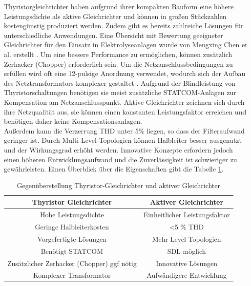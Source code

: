 Thyristorgleichrichter haben aufgrund ihrer kompakten Bauform eine höhere Leistungsdichte als aktive Gleichrichter und können in großen Stückzahlen kostengünstig produziert werden. Zudem gibt es bereits zahlreiche Lösungen für unterschiedliche Anwendungen. Eine Übersicht mit Bewertung geeigneter Gleichrichter für den Einsatz in Elektrolyseanlagen wurde von Mengxing Chen et al. erstellt \cite{HydrogenElectronicTopologies}. Um eine bessere Performance zu ermöglichen, können zusätzlich Zerhacker (Chopper) erforderlich sein. Um die Netzanschlussbedingungen zu erfüllen wird oft eine 12-pulsige Anordnung verwendet, wodurch sich der Aufbau des Netztransformators komplexer gestaltet \cite{HydrogenRectInf}. Aufgrund der Blindleistung von Thyristorschaltungen benötigen sie meist zusätzliche STATCOM-Anlagen zur Kompensation am Netzanschlusspunkt. Aktive Gleichrichter zeichnen sich durch ihre Netzqualität aus, sie können einen konstanten Leistungsfaktor erreichen und benötigen daher keine Kompensationsanlagen.\\ Außerdem kann die Verzerrung \gls{THD} unter 5\% liegen, so dass der Filteraufwand geringer ist. Durch Multi-Level-Topologien können Halbleiter besser ausgenutzt und der Wirkungsgrad erhöht werden. Innovative Konzepte erfordern jedoch einen höheren Entwicklungsaufwand und die Zuverlässigkeit ist schwieriger zu gewährleisten. Einen Überblick über die Eigenschaften gibt die Tabelle \ref{tab:thyVSafe}. 
\begin{table}[t]
	\centering
	\caption{Gegenüberstellung Thyristor-Gleichrichter und aktiver Gleichrichter}
	\label{tab:thyVSafe}
	\begin{tabular}{c|c} 
		\textbf{Thyristor Gleichrichter} & \textbf{Aktiver Gleichrichter} \\
		\hline
		Hohe Leistungsdichte & Einheitlicher Leistungsfaktor \\
		\hline
		Geringe Halbleiterkosten & <5 \% \gls{THD} \\
		\hline
		Vorgefertigte Lösungen & Mehr Level Topologien  \\
		\hline
		Benötigt STATCOM &  \gls{SDL} möglich \\
		\hline
		Zusätzlicher Zerhacker (Chopper) ggf  nötig & Innovative Lösungen \\
		\hline
		Komplexer Transformator & Aufwändigere Entwicklung \\
	\end{tabular}
\end{table}

